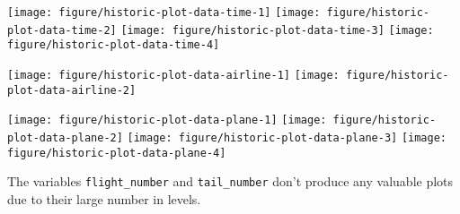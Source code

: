 \documentclass{article}\usepackage[]{graphicx}\usepackage[]{color}
\newenvironment{knitrout}{}{} %
\begin{document}
\begin{knitrout}
\color{fgcolor}

{\centering \texttt{[image: figure/historic-plot-data-time-1]} 
\texttt{[image: figure/historic-plot-data-time-2]} 
\texttt{[image: figure/historic-plot-data-time-3]} 
\texttt{[image: figure/historic-plot-data-time-4]} 

}



\end{knitrout}

\begin{knitrout}
\color{fgcolor}

{\centering \texttt{[image: figure/historic-plot-data-airline-1]} 
\texttt{[image: figure/historic-plot-data-airline-2]} 

}



\end{knitrout}

\begin{knitrout}
\color{fgcolor}

{\centering \texttt{[image: figure/historic-plot-data-plane-1]} 
\texttt{[image: figure/historic-plot-data-plane-2]} 
\texttt{[image: figure/historic-plot-data-plane-3]} 
\texttt{[image: figure/historic-plot-data-plane-4]} 

}



\end{knitrout}

The variables \verb+flight_number+ and \verb+tail_number+ don't produce any valuable plots due to their large number in levels.
\end{document}
